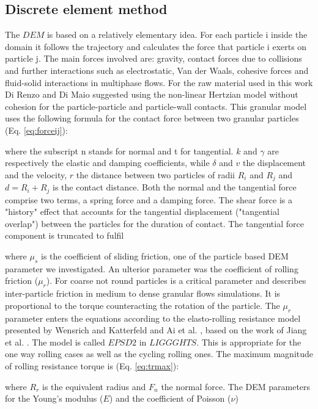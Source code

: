 \subsection{Discrete element method}
\label{subsec:dem}
The $DEM$ is based on a relatively elementary idea. 
For each particle i inside the domain it follows the trajectory and calculates the force that particle i exerts on particle j. 
The main forces involved are: gravity, contact forces due to collisions and further interactions such as electrostatic, 
Van der Waals, cohesive forces and fluid-solid interactions in multiphase flows. For the raw material used in this work 
Di Renzo and Di Maio \cite{RefWorks:145} suggested using the non-linear Hertzian model without cohesion for 
the particle-particle and particle-wall contacts. 
This granular model uses the following formula for the contact force between two granular particles (Eq. \ref{eq:forceij}):

where the subscript n stands for normal and t for tangential. 
$k$ and $\gamma$ are respectively the elastic and damping coefficients, 
while $\delta$ and $v$ the displacement and the velocity, $r$ the distance
between two particles of radii $R_i$ and $R_j$ and $d = R_i + R_j $ is the
contact distance.
Both the normal and the tangential
force comprise two terms, a spring force and a damping force. 
The shear force is a "history" effect that accounts for the tangential displacement 
("tangential overlap") between the particles for the duration of contact. 
The tangential force component is truncated to fulfil 

where $\mu_s$ is the coefficient of sliding friction, one of the particle based
DEM parameter we investigated. 
An ulterior parameter was the coefficient of rolling friction ($\mu_r$). 
For coarse not round particles is a critical parameter and describes inter-particle 
friction in medium to dense granular flows simulations. It is proportional to the 
torque counteracting the rotation of the particle. The $\mu_r$ parameter enters the 
equations according to the elasto-rolling resistance model presented by Wensrich and 
Katterfeld \cite{RefWorks:87} and Ai et al. \cite{RefWorks:131}, 
based on the work of Jiang et al. \cite{RefWorks:143}. 
The model is called $EPSD2$ in $LIGGGHTS$. This is appropriate for the one way
rolling cases as well as the cycling rolling ones.
The maximum magnitude of rolling resistance torque is (Eq. \ref{eq:trmax}):

where $R_r$ is the equivalent radius and $F_n$ the normal force.
The DEM parameters for the Young's modulus ($E$) and the coefficient of Poisson ($\nu$) 
